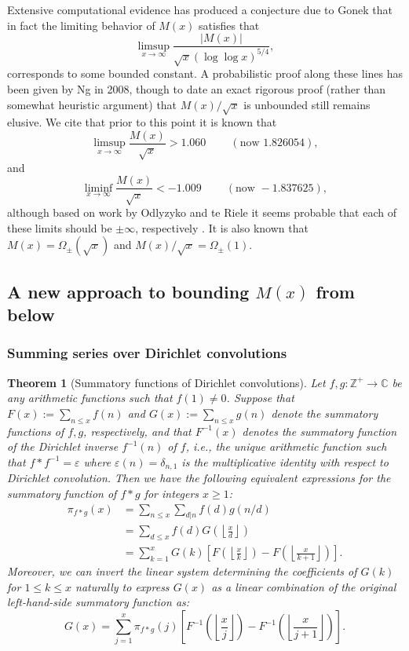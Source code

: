\documentclass[11pt,reqno,a4letter]{article}
\numberwithin{figure}{section}
\numberwithin{table}{section}
\newcommand{\cf}{\textit{cf.\ }}
\newcommand{\Floor}[2]{\ensuremath{\left\lfloor \frac{#1}{#2} \right\rfloor}}
\theoremstyle{plain}
\newtheorem{theorem}{Theorem}
\numberwithin{theorem}{section}
\theoremstyle{definition}
\begin{document}
Extensive computational evidence has produced 
a conjecture due to Gonek that in fact the limiting behavior of 
$M(x)$ satisfies 
that $$\limsup_{x \rightarrow \infty} \frac{|M(x)|}{\sqrt{x} 
(\log\log x)^{5/4}},$$ 
corresponds to some bounded constant. 
A probabilistic proof along these 
lines has been given by Ng in 2008, though to date an exact rigorous 
proof (rather than somewhat heuristic argument) that $M(x) / \sqrt{x}$ is 
unbounded still remains elusive. 
We cite that prior to this point it is known that \cite[\cf \S 4.1]{PRIMEREC} 
\[
\limsup_{x\rightarrow\infty} \frac{M(x)}{\sqrt{x}} > 1.060\ \qquad (\text{now } 1.826054), 
\] 
and 
\[ 
\liminf_{x\rightarrow\infty} \frac{M(x)}{\sqrt{x}} < -1.009\ \qquad (\text{now } -1.837625), 
\] 
although based on work by Odlyzyko and te Riele it seems probable that 
each of these limits should be $\pm \infty$, respectively 
\cite{ODLYZ-TRIELE,MREVISITED,ORDER-MERTENSFN,HURST-2017}. 
It is also known that $M(x) = \Omega_{\pm}(\sqrt{x})$ and 
$M(x) / \sqrt{x} = \Omega_{\pm}(1)$. 

\subsection{A new approach to bounding $M(x)$ from below} 

\subsubsection{Summing series over Dirichlet convolutions} 

\begin{theorem}[Summatory functions of Dirichlet convolutions] 
\label{theorem_SummatoryFuncsOfDirCvls} 
Let $f,g: \mathbb{Z}^{+} \rightarrow \mathbb{C}$ be any arithmetic functions such that $f(1) \neq 0$. 
Suppose that $F(x) := \sum_{n \leq x} f(n)$ and $G(x) := \sum_{n \leq x} g(n)$ denote the summatory 
functions of $f,g$, respectively, and that $F^{-1}(x)$ denotes the summatory function of the 
Dirichlet inverse $f^{-1}(n)$ of $f$, i.e., the unique arithmetic function such that 
$f \ast f^{-1} = \varepsilon$ where $\varepsilon(n) = \delta_{n,1}$ is the multiplicative identity 
with respect to Dirichlet convolution. Then we have the following equivalent expressions for the 
summatory function of $f \ast g$ for integers $x \geq 1$: 
\begin{align*} 
\pi_{f \ast g}(x) & = \sum_{n \leq x} \sum_{d|n} f(d) g(n/d) \\ 
     & = \sum_{d \leq x} f(d) G\left(\Floor{x}{d}\right) \\ 
     & = \sum_{k=1}^{x} G(k) \left[F\left(\Floor{x}{k}\right) - 
     F\left(\Floor{x}{k+1}\right)\right]. 
\end{align*} 
Moreover, we can invert the linear system determining the coefficients of $G(k)$ for $1 \leq k \leq x$ 
naturally to express $G(x)$ as a linear combination of the original left-hand-side summatory function as:
\[
G(x) = \sum_{j=1}^{x} \pi_{f \ast g}(j) \left[F^{-1}\left(\Floor{x}{j}\right) - 
     F^{-1}\left(\Floor{x}{j+1}\right)\right]. 
\]
\end{theorem} 
\end{document}
